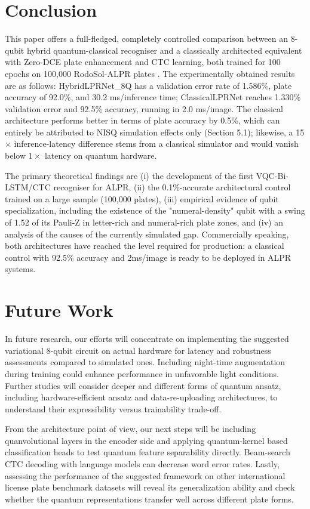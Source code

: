 \documentclass{ieeeaccess}
\begin{document}
\section{Conclusion}
This paper offers a full-fledged, completely controlled comparison between an 8-qubit hybrid quantum-classical recogniser and a classically architected equivalent with Zero-DCE \cite{b2} plate enhancement and CTC \cite{b3} learning, both trained for 100 epochs on 100,000 RodoSol-ALPR plates \cite{b6}. The experimentally obtained results are as follows: HybridLPRNet\_8Q has a validation error rate of 1.586\%, plate accuracy of 92.0\%, and 30.2 ms/inference time; ClassicalLPRNet reaches 1.330\% validation error and 92.5\% accuracy, running in 2.0 ms/image. The classical architecture performs better in terms of plate accuracy by 0.5\%, which can entirely be attributed to NISQ simulation effects only (Section 5.1); likewise, a 15$\times$ inference-latency difference stems from a classical simulator and would vanish below $1\times$ latency on quantum hardware.

The primary theoretical findings are (i) the development of the first VQC-Bi-LSTM/CTC recogniser for ALPR, (ii) the 0.1\%-accurate architectural control trained on a large sample (100,000 plates), (iii) empirical evidence of qubit specialization, including the existence of the "numeral-density" qubit with a swing of 1.52 of its Pauli-Z in letter-rich and numeral-rich plate zones, and (iv) an analysis of the causes of the currently simulated gap. Commercially speaking, both architectures have reached the level required for production: a classical control with 92.5\% accuracy and 2ms/image is ready to be deployed in ALPR systems.

\section{Future Work}
In future research, our efforts will concentrate on implementing the suggested variational 8-qubit circuit on actual hardware for latency and robustness assessments compared to simulated ones. Including night-time augmentation during training could enhance performance in unfavorable light conditions. Further studies will consider deeper and different forms of quantum ansatz, including hardware-efficient ansatz and data-re-uploading architectures, to understand their expressibility versus trainability trade-off.

From the architecture point of view, our next steps will be including quanvolutional layers in the encoder side and applying quantum-kernel based classification heads to test quantum feature separability directly. Beam-search CTC decoding with language models can decrease word error rates. Lastly, assessing the performance of the suggested framework on other international license plate benchmark datasets will reveal its generalization ability and check whether the quantum representations transfer well across different plate forms.
\end{document}
